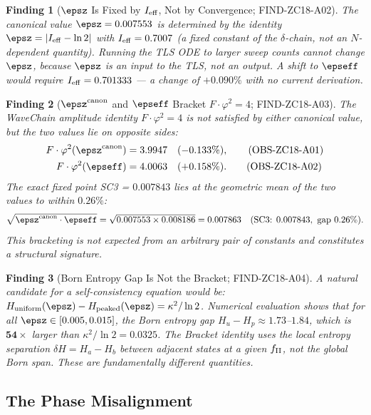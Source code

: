 \documentclass[12pt, a4paper]{article}
\newtheorem{finding}{Finding}[section]
\begin{document}
\begin{finding}[$\epsz$ Is Fixed by $I_{\rm eff}$, Not by Convergence;
  FIND-ZC18-A02]
\label{zc18a:find:ieff}
The canonical value $\epsz = 0.007553$ is determined by the identity
$\epsz = |I_{\rm eff} - \ln 2|$ with $I_{\rm eff} = 0.7007$
(a fixed constant of the $\delta$-chain, not an $N$-dependent quantity).
Running the TLS ODE to larger sweep counts cannot change $\epsz$,
because $\epsz$ is an \emph{input} to the TLS, not an output.
A shift to $\epseff$ would require $I_{\rm eff} = 0.701333$
--- a change of $+0.090\%$ with no current derivation.
\end{finding}

\begin{finding}[$\epsz^{\rm canon}$ and $\epseff$ Bracket $F\cdot\varphi^2=4$;
  FIND-ZC18-A03]
\label{zc18a:find:bracket}
The WaveChain amplitude identity $F\cdot\varphi^2 = 4$ is not satisfied
by either canonical value, but the two values lie on opposite sides:
\begin{align}
  F\cdot\varphi^2(\epsz^{\rm canon})
  &= 3.9947 \quad (-0.133\%),
  \tag{OBS-ZC18-A01}\\
  F\cdot\varphi^2(\epseff)
  &= 4.0063 \quad (+0.158\%).
  \tag{OBS-ZC18-A02}
\end{align}
The exact fixed point SC3 = $0.007843$ lies at the geometric mean of
the two values to within $0.26\%$:
\[
  \sqrt{\epsz^{\rm canon}\cdot\epseff}
  = \sqrt{0.007553\times 0.008186}
  = 0.007863
  \quad\text{(SC3: }0.007843,\text{ gap }0.26\%).
\]
This bracketing is not expected from an arbitrary pair of constants
and constitutes a structural signature.
\end{finding}

\begin{finding}[Born Entropy Gap Is Not the Bracket; FIND-ZC18-A04]
\label{zc18a:find:born}
A natural candidate for a self-consistency equation would be:
$H_{\rm uniform}(\epsz) - H_{\rm peaked}(\epsz) = \kappa^2/\ln 2$.
Numerical evaluation shows that for all $\epsz\in[0.005, 0.015]$,
the Born entropy gap $H_u - H_p \approx 1.73$--$1.84$,
which is $\mathbf{54}\times$ larger than $\kappa^2/\ln 2 = 0.0325$.
The Bracket identity uses the \emph{local} entropy separation
$\delta H = H_a - H_b$ between adjacent states at a given $f_{\rm II}$,
not the global Born span.
These are fundamentally different quantities.
\end{finding}

\subsection{The Phase Misalignment}
\label{zc18a:sec:pm}
\end{document}

